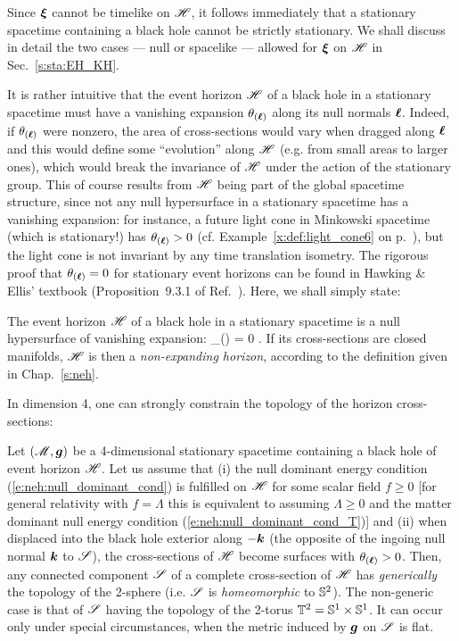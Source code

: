 Since $\bm{\xi}$ cannot be timelike on $\mathscr{H}$, it follows immediately
that a stationary spacetime containing a black hole cannot be strictly stationary.
We shall discuss in detail the two cases --- null or spacelike --- allowed
for $\bm{\xi}$ on $\mathscr{H}$ in Sec.~\ref{s:sta:EH_KH}.

It is rather intuitive that the event horizon $\mathscr{H}$ of a black hole in
a stationary spacetime must have a vanishing expansion $\theta_{(\bm{\ell})}$ along its null
normals $\bm{\ell}$. Indeed, if $\theta_{(\bm{\ell})}$ were nonzero,
the area of cross-sections would vary when dragged
along $\bm{\ell}$ and this would define some ``evolution'' along $\mathscr{H}$ (e.g. from small areas
to larger ones),
which would break the invariance of $\mathscr{H}$ under the action of the stationary group.
This of course results from $\mathscr{H}$ being part of the global spacetime structure,
since not any null hypersurface in a stationary spacetime has a vanishing
expansion: for instance, a future light cone in Minkowski spacetime
(which is stationary!) has $\theta_{(\bm{\ell})}>0$
(cf. Example~\ref{x:def:light_cone6} on p.~\pageref{x:def:light_cone6}),
but the light cone is not invariant by any time translation isometry.
The rigorous proof that $\theta_{(\bm{\ell})} = 0$
for stationary event horizons can be found in Hawking \& Ellis' textbook
(Proposition~9.3.1 of Ref.~\cite{HawkiE73}).
Here, we shall simply state:
\begin{prop}
\label{p:sta:hor_non_expanding}
The event horizon $\mathscr{H}$ of a black hole in a stationary spacetime
is a null hypersurface of vanishing expansion:
\be
    \theta_{(\wl)} = 0 .
\ee
If its cross-sections are closed manifolds, $\mathscr{H}$ is then a
\emph{non-expanding horizon},
according to the definition given in Chap.~\ref{s:neh}.
\end{prop}

In dimension 4, one can strongly constrain the topology of the horizon cross-sections:

\begin{prop}
\label{p:sta:topology1}
Let $(\mathscr{M}, \bm{g})$ be a 4-dimensional stationary spacetime
containing a black hole of event horizon $\mathscr{H}$.
Let us assume that
(i) the null dominant energy condition (\ref{e:neh:null_dominant_cond})
is fulfilled on $\mathscr{H}$ for some scalar field $f \geq 0$
[for general relativity with $f=\Lambda$
this is equivalent to assuming $\Lambda \geq 0$ and
the matter dominant null energy condition (\ref{e:neh:null_dominant_cond_T})]
and (ii) when
displaced into the black hole exterior along $-\bm{k}$ (the opposite of
the ingoing null normal $\bm{k}$ to $\mathscr{S}$), the
cross-sections of $\mathscr{H}$ become surfaces with $\theta_{(\bm{\ell})} > 0$.
Then, any connected component $\mathscr{S}$ of a complete cross-section of $\mathscr{H}$
has \emph{generically} the topology of the 2-sphere (i.e. $\mathscr{S}$ is
\emph{homeomorphic} to $\mathbb{S}^2$). The non-generic case
is that of $\mathscr{S}$ having the topology of the 2-torus $\mathbb{T}^2 = \mathbb{S}^1\times\mathbb{S}^1$. It can occur
only under special circumstances, when the metric induced by $\bm{g}$ on $\mathscr{S}$
is flat.
\end{prop}


